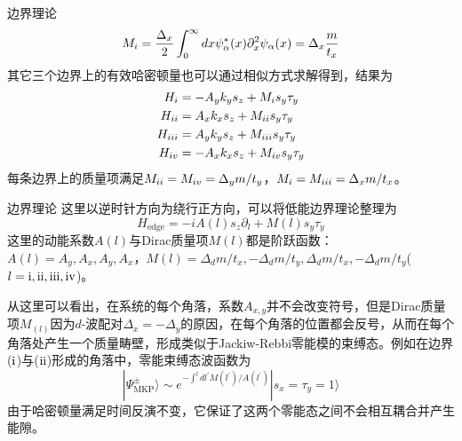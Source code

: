 \documentclass[10pt,aspectratio=169]{beamer} %
\begin{document}
\begin{frame}{边界理论}
\begin{equation}
M_{\uppercase\expandafter{\romannumeral1}}=\frac{\Delta_x}{2}\int_{0}^{\infty}dx\psi_\alpha^*(x)\partial_x^2\psi_\alpha(x)=\Delta_x\frac{m}{t_x}
\end{equation}
其它三个边界上的有效哈密顿量也可以通过相似方式求解得到，结果为
\begin{equation}
\begin{aligned}
H_{\uppercase\expandafter{\romannumeral1}}&=-A_yk_ys_z+M_{\uppercase\expandafter{\romannumeral1}}s_y\tau_y\\
H_{\uppercase\expandafter{\romannumeral2}}&=A_xk_xs_z+M_{\uppercase\expandafter{\romannumeral2}}s_y\tau_y\\
H_{\uppercase\expandafter{\romannumeral3}}&=A_yk_ys_z+M_{\uppercase\expandafter{\romannumeral3}}s_y\tau_y\\
H_{\uppercase\expandafter{\romannumeral4}}&=-A_xk_xs_z+M_{\uppercase\expandafter{\romannumeral4}}s_y\tau_y\\\label{edge1}
\end{aligned}
\end{equation}
每条边界上的质量项满足$M_{\uppercase\expandafter{\romannumeral2}}=M_{\uppercase\expandafter{\romannumeral4}}=\Delta_ym/t_y$，$M_{\uppercase\expandafter{\romannumeral1}}=M_{\uppercase\expandafter{\romannumeral3}}=\Delta_xm/t_x$。

\end{frame}
\begin{frame}{边界理论}
	这里以逆时针方向为绕行正方向，可以将低能边界理论整理为
	\begin{equation}
	H_{\mathrm{edge}}=-iA(l)s_z\partial_l+M(l)s_y\tau_y\label{edge2}
	\end{equation}
这里的动能系数$A(l)$与Dirac质量项$M(l)$都是阶跃函数：$A(l)=A_y,A_x,A_y,A_x$，$M(l)=\Delta_dm/t_x,-\Delta_dm/t_y,\Delta_dm/t_x,-\Delta_dm/t_y$($l=\mathrm{\uppercase\expandafter{\romannumeral1},\uppercase\expandafter{\romannumeral2},\uppercase\expandafter{\romannumeral3},\uppercase\expandafter{\romannumeral4}}$)。

从这里可以看出，在系统的每个角落，系数$A_{x,y}$并不会改变符号，但是Dirac质量项$M_(l)$因为$d$-波配对$\Delta_x=-\Delta_y$的原因，在每个角落的位置都会反号，从而在每个角落处产生一个质量畴壁，形成类似于Jackiw-Rebbi零能模的束缚态。例如在边界($\mathrm{\uppercase\expandafter{\romannumeral1}}$)与($\mathrm{\uppercase\expandafter{\romannumeral2}}$)形成的角落中，零能束缚态波函数为
\begin{equation}
|\Psi^\pm_{\mathrm{MKP}}\rangle\sim e^{-\int^ldl^{'}M(l^{'})/A(l^{'})}|s_x=\tau_y=1\rangle
\end{equation}
由于哈密顿量满足时间反演不变，它保证了这两个零能态之间不会相互耦合并产生能隙。
\end{frame}
\end{document}
